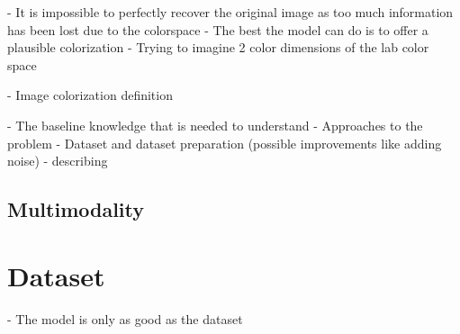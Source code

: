 - It is impossible to perfectly recover the original image as too much information has been lost due to the colorspace
- The best the model can do is to offer a plausible colorization
- Trying to imagine 2 color dimensions of the lab color space

- Image colorization definition

- The baseline knowledge that is needed to understand
- Approaches to the problem
- Dataset and dataset preparation (possible improvements like adding noise)
- describing 


\subsection{Multimodality}

\section{Dataset}
\label{sec:dataset}

- The model is only as good as the dataset


